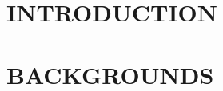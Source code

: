 \documentclass[letterpaper,11pt]{article}
\title{\normalsize}
\begin{document}

\newpage

\tableofcontents
\newpage

\section{INTRODUCTION}


\section{BACKGROUNDS}

\end{document}
